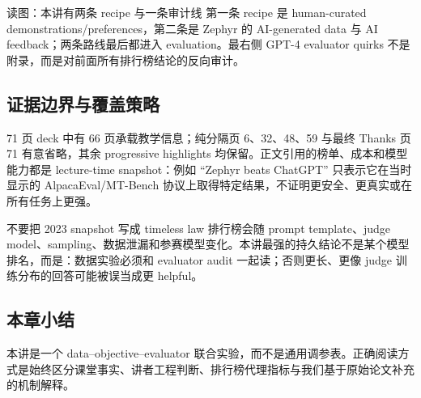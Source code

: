 
\begin{knowledgebox}{读图：本讲有两条 recipe 与一条审计线}
第一条 recipe 是 human-curated demonstrations/preferences，第二条是 Zephyr 的 AI-generated data 与 AI feedback；两条路线最后都进入 evaluation。最右侧 GPT-4 evaluator quirks 不是附录，而是对前面所有排行榜结论的反向审计。
\end{knowledgebox}

\subsection{证据边界与覆盖策略}

71 页 deck 中有 66 页承载教学信息；纯分隔页 6、32、48、59 与最终 Thanks 页 71 有意省略，其余 progressive highlights 均保留。正文引用的榜单、成本和模型能力都是 lecture-time snapshot：例如 ``Zephyr beats ChatGPT'' 只表示它在当时显示的 AlpacaEval/MT-Bench 协议上取得特定结果，不证明更安全、更真实或在所有任务上更强。

\begin{warningbox}{不要把 2023 snapshot 写成 timeless law}
排行榜会随 prompt template、judge model、sampling、数据泄漏和参赛模型变化。本讲最强的持久结论不是某个模型排名，而是：数据实验必须和 evaluator audit 一起读；否则更长、更像 judge 训练分布的回答可能被误当成更 helpful。
\end{warningbox}

\subsection{本章小结}

本讲是一个 data--objective--evaluator 联合实验，而不是通用调参表。正确阅读方式是始终区分课堂事实、讲者工程判断、排行榜代理指标与我们基于原始论文补充的机制解释。

